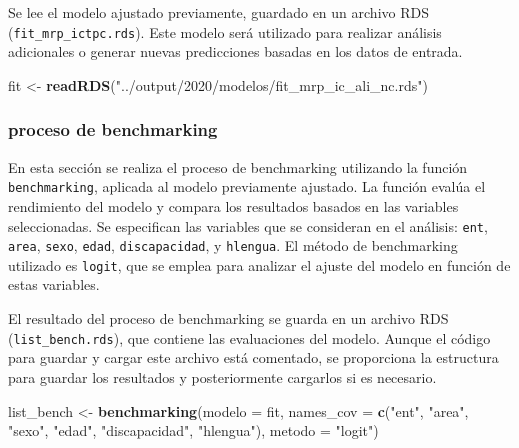 \documentclass[
  12pt,
]{book}
\newenvironment{Shaded}{\begin{snugshade}}{\end{snugshade}}
\newcommand{\AttributeTok}[1]{\textcolor[rgb]{0.13,0.29,0.53}{#1}}
\newcommand{\FunctionTok}[1]{\textcolor[rgb]{0.13,0.29,0.53}{\textbf{#1}}}
\newcommand{\NormalTok}[1]{#1}
\newcommand{\OtherTok}[1]{\textcolor[rgb]{0.56,0.35,0.01}{#1}}
\newcommand{\StringTok}[1]{\textcolor[rgb]{0.31,0.60,0.02}{#1}}
\begin{document}
Se lee el modelo ajustado previamente, guardado en un archivo RDS (\texttt{fit\_mrp\_ictpc.rds}). Este modelo será utilizado para realizar análisis adicionales o generar nuevas predicciones basadas en los datos de entrada.

\begin{Shaded}
\begin{Highlighting}[]
\NormalTok{fit }\OtherTok{\textless{}{-}} \FunctionTok{readRDS}\NormalTok{(}\StringTok{"../output/2020/modelos/fit\_mrp\_ic\_ali\_nc.rds"}\NormalTok{)}
\end{Highlighting}
\end{Shaded}

\hypertarget{proceso-de-benchmarking-1}{%
\subsubsection*{proceso de benchmarking}\label{proceso-de-benchmarking-1}}

En esta sección se realiza el proceso de benchmarking utilizando la función \texttt{benchmarking}, aplicada al modelo previamente ajustado. La función evalúa el rendimiento del modelo y compara los resultados basados en las variables seleccionadas. Se especifican las variables que se consideran en el análisis: \texttt{ent}, \texttt{area}, \texttt{sexo}, \texttt{edad}, \texttt{discapacidad}, y \texttt{hlengua}. El método de benchmarking utilizado es \texttt{logit}, que se emplea para analizar el ajuste del modelo en función de estas variables.

El resultado del proceso de benchmarking se guarda en un archivo RDS (\texttt{list\_bench.rds}), que contiene las evaluaciones del modelo. Aunque el código para guardar y cargar este archivo está comentado, se proporciona la estructura para guardar los resultados y posteriormente cargarlos si es necesario.

\begin{Shaded}
\begin{Highlighting}[]
\NormalTok{list\_bench }\OtherTok{\textless{}{-}} \FunctionTok{benchmarking}\NormalTok{(}\AttributeTok{modelo =}\NormalTok{ fit,}
             \AttributeTok{names\_cov =}   \FunctionTok{c}\NormalTok{(}\StringTok{"ent"}\NormalTok{,}
                             \StringTok{"area"}\NormalTok{,}
                             \StringTok{"sexo"}\NormalTok{,}
                             \StringTok{"edad"}\NormalTok{,}
                             \StringTok{"discapacidad"}\NormalTok{,}
                             \StringTok{"hlengua"}\NormalTok{),                      }
             \AttributeTok{metodo =} \StringTok{"logit"}\NormalTok{)}
\end{Highlighting}
\end{Shaded}
\end{document}
